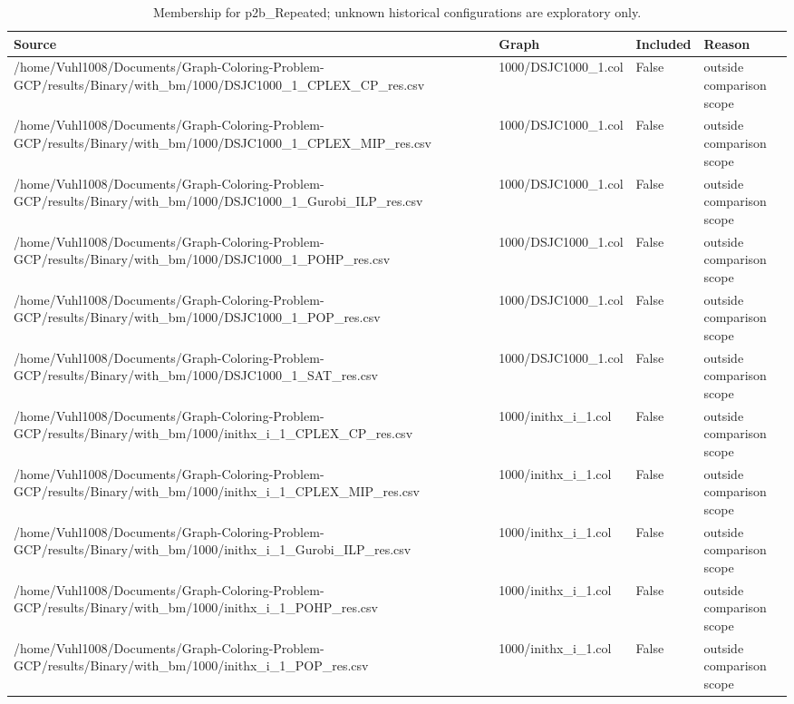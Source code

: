 \begin{table}[htbp]
\centering
\caption{Membership for p2b\_Repeated; unknown historical configurations are exploratory only.}
\label{tab:p2b-Repeated-membership}
\begin{tabular}{llll}
\hline
Source & Graph & Included & Reason \\
\hline
/home/Vuhl1008/Documents/Graph-Coloring-Problem-GCP/results/Binary/with\_bm/1000/DSJC1000\_1\_CPLEX\_CP\_res.csv & 1000/DSJC1000\_1.col & False & outside comparison scope \\
/home/Vuhl1008/Documents/Graph-Coloring-Problem-GCP/results/Binary/with\_bm/1000/DSJC1000\_1\_CPLEX\_MIP\_res.csv & 1000/DSJC1000\_1.col & False & outside comparison scope \\
/home/Vuhl1008/Documents/Graph-Coloring-Problem-GCP/results/Binary/with\_bm/1000/DSJC1000\_1\_Gurobi\_ILP\_res.csv & 1000/DSJC1000\_1.col & False & outside comparison scope \\
/home/Vuhl1008/Documents/Graph-Coloring-Problem-GCP/results/Binary/with\_bm/1000/DSJC1000\_1\_POHP\_res.csv & 1000/DSJC1000\_1.col & False & outside comparison scope \\
/home/Vuhl1008/Documents/Graph-Coloring-Problem-GCP/results/Binary/with\_bm/1000/DSJC1000\_1\_POP\_res.csv & 1000/DSJC1000\_1.col & False & outside comparison scope \\
/home/Vuhl1008/Documents/Graph-Coloring-Problem-GCP/results/Binary/with\_bm/1000/DSJC1000\_1\_SAT\_res.csv & 1000/DSJC1000\_1.col & False & outside comparison scope \\
/home/Vuhl1008/Documents/Graph-Coloring-Problem-GCP/results/Binary/with\_bm/1000/inithx\_i\_1\_CPLEX\_CP\_res.csv & 1000/inithx\_i\_1.col & False & outside comparison scope \\
/home/Vuhl1008/Documents/Graph-Coloring-Problem-GCP/results/Binary/with\_bm/1000/inithx\_i\_1\_CPLEX\_MIP\_res.csv & 1000/inithx\_i\_1.col & False & outside comparison scope \\
/home/Vuhl1008/Documents/Graph-Coloring-Problem-GCP/results/Binary/with\_bm/1000/inithx\_i\_1\_Gurobi\_ILP\_res.csv & 1000/inithx\_i\_1.col & False & outside comparison scope \\
/home/Vuhl1008/Documents/Graph-Coloring-Problem-GCP/results/Binary/with\_bm/1000/inithx\_i\_1\_POHP\_res.csv & 1000/inithx\_i\_1.col & False & outside comparison scope \\
/home/Vuhl1008/Documents/Graph-Coloring-Problem-GCP/results/Binary/with\_bm/1000/inithx\_i\_1\_POP\_res.csv & 1000/inithx\_i\_1.col & False & outside comparison scope \\

\end{tabular}
\end{table}
